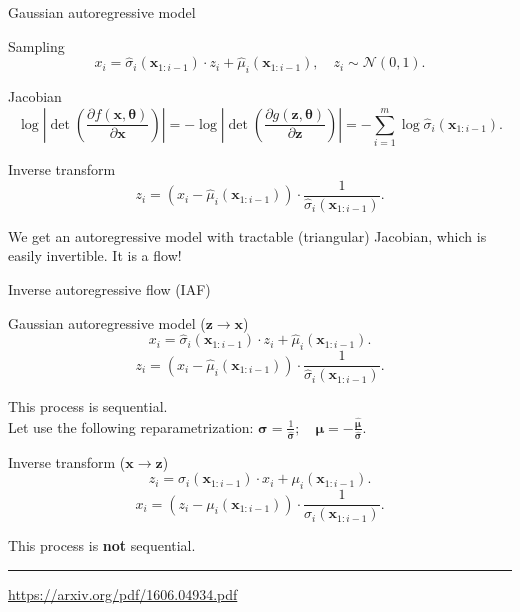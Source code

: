 \documentclass{beamer}
\newcommand{\bx}{\mathbf{x}}
\newcommand{\bz}{\mathbf{z}}
\newcommand{\bmu}{\boldsymbol{\mu}}
\newcommand{\bsigma}{\boldsymbol{\sigma}}
\newcommand{\btheta}{\boldsymbol{\theta}}
\begin{document}
\begin{frame}{Gaussian autoregressive model}
	\begin{block}{Sampling}
		\vspace{-0.5cm}
		\[
		x_i = \hat{\sigma}_i (\bx_{1:i-1}) \cdot z_i + \hat{\mu}_i(\bx_{1:i-1}), \quad z_i \sim \mathcal{N}(0, 1).
		\]
		\vspace{-0.5cm}
	\end{block}
	\begin{block}{Jacobian}
		\vspace{-0.5cm}
		\[
		\log \left|\det \left( \frac{\partial f(\bx, \btheta)}{\partial \bx} \right) \right| = -\log \left|\det \left( \frac{\partial g(\bz, \btheta)}{\partial \bz} \right) \right| = - \sum_{i = 1}^m \log \hat{\sigma}_i (\bx_{1:i-1}).
		\]
		\vspace{-0.5cm}
	\end{block} 
	\begin{block}{Inverse transform}
		\vspace{-0.5cm}
		\[
		z_i = \left(x_i - \hat{\mu}_i(\bx_{1:i-1}) \right) \cdot \frac{1}{\hat{\sigma}_i (\bx_{1:i-1}) }.
		\]
	\end{block}
	We get an autoregressive model with tractable (triangular) Jacobian, which is easily invertible. It is a flow!
\end{frame}
\begin{frame}{Inverse autoregressive flow (IAF)}
	
	\begin{block}{Gaussian autoregressive model ($\bz \rightarrow \bx$)}
		\vspace{-0.2cm}
		\[
			x_i = \hat{\sigma}_i (\bx_{1:i-1}) \cdot z_i + \hat{\mu}_i(\bx_{1:i-1}).
		\]
		\[
			z_i = \left(x_i - \hat{\mu}_i(\bx_{1:i-1}) \right) \cdot \frac{1}{ \hat{\sigma}_i (\bx_{1:i-1})}.
		\]
		\vspace{-0.3cm}
	\end{block}
	This process is sequential. \\
	Let use the following reparametrization:
	$\bsigma = \frac{1}{\hat{\bsigma}}; \quad \bmu = - \frac{\hat{\bmu}}{\hat{\bsigma}}.$
	
	\begin{block}{Inverse transform ($\bx \rightarrow \bz$)}
		\vspace{-0.2cm}
		\[
			z_i = \sigma_i (\bx_{1:i-1}) \cdot x_i + \mu_i(\bx_{1:i-1}).
		\]
		\[
			x_i = \left( z_i - \mu_i(\bx_{1:i-1})\right) \cdot \frac{1}{\sigma_i (\bx_{1:i-1}) }.
		\]
		\vspace{-0.3cm}
	\end{block}
	This process is \textbf{not} sequential.
	\vfill
	\hrule\medskip
	{\scriptsize \href{https://arxiv.org/pdf/1606.04934.pdf}{https://arxiv.org/pdf/1606.04934.pdf}} 
\end{frame}
\end{document}
